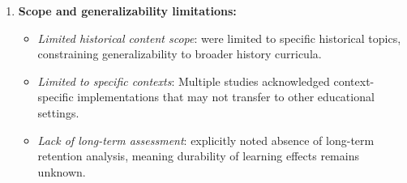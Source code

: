 \documentclass[a4paper,fleqn]{cas-sc}
\begin{document}
\begin{enumerate}[noitemsep]
\begin{itemize}[noitemsep]
 \item \textit{Subjective engagement assessment}: \citet{1Barbatsis201159} noted subjectivity in engagement assessment methods.
 
 \item \textit{Perceived versus actual learning}: \citet{5kazanidis2018alpha} relied on perceived rather than actual learning outcomes, which may not correlate with objective knowledge gains.
 
 \item \textit{Limited scope of assessment}: \citet{19Chou2019} noted lack of data about high-level cognitive processes, focusing primarily on lower-order knowledge.
 
 \item \textit{Questionable validity of instruments}: \citet{52Lin2011265} raised concerns about the validity of Likert scales for early teen populations.
 
 \item \textit{Survey instrument limitations}: \citet{8Yu2014} noted the need for further validation of survey instruments used.
 
 \item \textit{Incomplete data collection}: \citet{60Hoy2018} reported incomplete data collection affecting analysis.
 
 \item \textit{Challenge design reliability issues}: \citet{40Kuran2018} found poor reliability ($\alpha$=.1428) in challenge design measurements.
\end{itemize}

	\item 
\textbf{Scope and generalizability limitations:}

\begin{itemize}[noitemsep]
 \item \textit{Limited historical content scope}: \citet{1Barbatsis201159, 5kazanidis2018alpha, 41Petersen2023301, 71lynch2015pedagogical} were limited to specific historical topics, constraining generalizability to broader history curricula.
 
 \item \textit{Limited to specific contexts}: Multiple studies acknowledged context-specific implementations that may not transfer to other educational settings.
 
 \item \textit{Lack of long-term assessment}: \citet{2Mahamarowi2023133, 5kazanidis2018alpha, 13Humpire2022, 22Nugroho2020149, 32Cheng20241718, 40Kuran2018, 47Clara2010156} explicitly noted absence of long-term retention analysis, meaning durability of learning effects remains unknown.
 

\end{itemize}
\end{enumerate}
\end{document}
